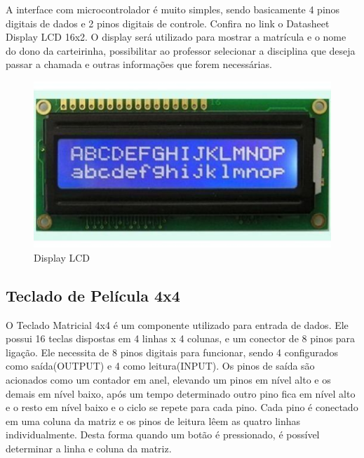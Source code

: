 A interface com microcontrolador é muito simples, sendo basicamente 4 pinos digitais de dados e 2 pinos digitais de controle. Confira no link o Datasheet Display LCD 16x2. O display será utilizado para mostrar a matrícula e o nome do dono da carteirinha, possibilitar ao professor selecionar a disciplina que deseja passar a chamada e outras informações que forem necessárias.

\begin{figure}[!ht]
  \centering
  \includegraphics[keepaspectratio=true,scale=0.45]{figuras/lcd.eps}
  \caption{Display LCD}
\end{figure}

\pagebreak

\subsection{Teclado de Película 4x4}
O Teclado Matricial 4x4 é um componente utilizado para entrada de dados. Ele possui 16 teclas dispostas em 4 linhas x 4 colunas, e um conector de 8 pinos para ligação. Ele necessita de 8 pinos digitais para funcionar, sendo 4 configurados como saída(OUTPUT) e 4 como leitura(INPUT). Os pinos de saída são acionados como um contador em anel, elevando um pinos em nível alto e os demais em nível baixo, após um tempo determinado outro pino fica em nível alto e o resto em nível baixo e o ciclo se repete para cada pino. Cada pino é conectado em uma coluna da matriz e os pinos de leitura lêem as quatro linhas individualmente. Desta forma quando um botão é pressionado,  é possível determinar a linha e coluna da matriz.

